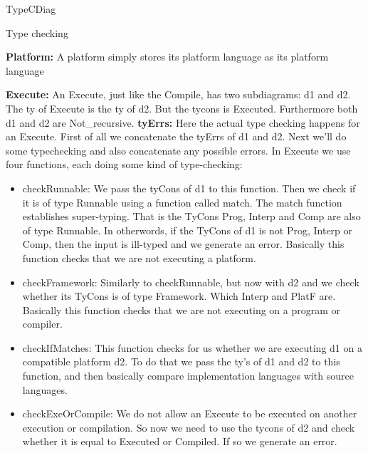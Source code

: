 \documentclass{article}
\begin{document}
\begin{subsection}{TypeCDiag}
\begin{subsubsection}{Type checking}
\hfill \break

\textbf{Platform:} A platform simply stores its platform language as its platform language

\hfill \break

\textbf{Execute:} An Execute, just like the Compile, has two subdiagrams: d1 and d2. The ty of Execute is the ty of d2. But the tycons is Executed. Furthermore both d1 and d2 are Not\_recursive.
\textbf{tyErrs:} Here the actual type checking happens for an Execute. First of all we concatenate the tyErrs of d1 and d2. Next we'll do some typechecking and also concatenate any possible errors. In Execute we use four functions, each doing some kind of type-checking:
	\begin{itemize}
	\item checkRunnable: We pass the tyCons of d1 to this function. Then we check if it is of type Runnable using a function called match. The match function establishes super-typing. That is the TyCons Prog, Interp and Comp are also of type Runnable. In otherwords, if the TyCons of d1 is not Prog, Interp or Comp, then the input is ill-typed and we generate an error. Basically this function checks that we are not executing a platform.
	\item checkFramework: Similarly to checkRunnable, but now with d2 and we check whether its TyCons is of type Framework. Which Interp and PlatF are. Basically this function checks that we are not executing on a program or compiler.
	\item checkIfMatches: This function checks for us whether we are executing d1 on a compatible platform d2. To do that we pass the ty's of d1 and d2 to this function, and then basically compare implementation languages with source languages.
	\item checkExeOrCompile: We do not allow an Execute to be executed on another execution or compilation. So now we need to use the tycons of d2 and check whether it is equal to Executed or Compiled. If so we generate an error.
	\end{itemize}

\hfill \break


\end{subsubsection}
\end{subsection}
\end{document}

